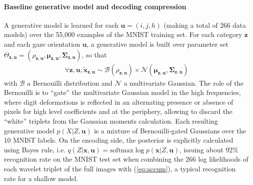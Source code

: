 \documentclass{article}
\begin{document}
\paragraph{Baseline generative model and decoding compression}
A generative model is learned for each $\boldsymbol{u} = (i,j,h)$ (making a total of 266 data models) over the 55,000 examples of the MNIST training set. For each category $\boldsymbol{z}$ and each gaze orientation $\boldsymbol{u}$, a generative model is built over parameter set $\Theta_{\boldsymbol{z},\boldsymbol{u}} = (\rho_{\boldsymbol{z},\boldsymbol{u}}, \boldsymbol{\mu}_{\boldsymbol{z},\boldsymbol{u}}, \boldsymbol{\Sigma}_{\boldsymbol{z},\boldsymbol{u}})$, so that 
\begin{align}
\forall \boldsymbol{z},\boldsymbol{u}, \tilde{\boldsymbol{x}}_{\boldsymbol{z},\boldsymbol{u}} \sim \mathcal{B}(\rho_{\boldsymbol{z},\boldsymbol{u}}) \times \mathcal{N}(\boldsymbol{\mu}_{\boldsymbol{z},\boldsymbol{u}}, \boldsymbol{\Sigma}_{\boldsymbol{z},\boldsymbol{u}})\label{eq:bernouilli-gated}
\end{align} 
with $\mathcal{B}$ a Bernouilli distribution and $\mathcal{N}$ a multivariate Gaussian. The role of the Bernouilli is to ``gate'' the multivariate Gaussian model in the high frequencies, where digit deformations is reflected in an alternating presence or absence of pixels for high level coefficients and at the periphery, allowing to discard the ``white'' triplets from the Gaussian moments calculation. Each resulting generative model $p(X|Z,\boldsymbol{u})$ is a mixture of Bernouilli-gated Gaussians over the 10 MNIST labels. On the encoding side, the posterior is explicitly calculated using Bayes rule, i.e. $q(Z|\boldsymbol{x},\boldsymbol{u}) = \text{softmax} \log p(\boldsymbol{x}|Z,\boldsymbol{u})$, issuing about 92\% recognition rate on the MNIST test set when combining the 266 log likelihoods of each wavelet triplet of the full images with (\ref{eq:accum}), a typical recognition rate for a shallow model.
\end{document}
